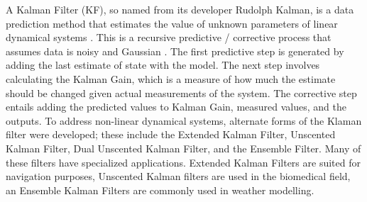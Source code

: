 \documentclass{article}
\begin{document}
A Kalman Filter (KF), so named from its developer Rudolph Kalman, is a data prediction method that estimates the value of unknown parameters of linear dynamical systems \cite{inbook}. This is a recursive predictive / corrective process that assumes data is noisy and Gaussian \cite{inproceedings, article7}. The first predictive step is generated by adding the last estimate of state with the model. The next step involves calculating the Kalman Gain, which is a measure of how much the estimate should be changed given actual measurements of the system. The corrective step entails adding the predicted values to Kalman Gain, measured values, and the outputs. To address non-linear dynamical systems, alternate forms of the Klaman filter were developed; these include the Extended Kalman Filter, Unscented Kalman Filter, Dual Unscented Kalman Filter, and the Ensemble Filter. Many of these filters have specialized applications. Extended Kalman Filters are suited for navigation purposes, Unscented Kalman filters are used in the biomedical field, an Ensemble Kalman Filters are commonly used in weather modelling.
\end{document}
